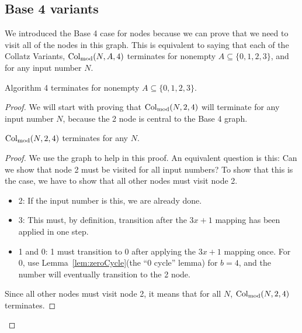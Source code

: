 \subsection{Base 4 variants} \label{subsubsec:base4variants}
We introduced the Base 4 case for nodes because we can prove that we need to visit all of the nodes in this graph. This is equivalent to saying that each of the Collatz Variants, $\mathrm{Col}_{\text{mod}}(N,A,4)$ terminates for nonempty $A \subseteq \{0,1,2,3\}$, and for any input number $N$. 
\begin{theorem}
Algorithm 4 terminates for nonempty $A \subseteq \{0,1,2,3\}$.
\end{theorem}
\begin{proof}
We will start with proving that $\mathrm{Col}_{\text{mod}}(N,2,4)$ will terminate for any input number $N$, because the 2 node is central to the Base 4 graph.\par
\begin{lemma}
\label{lem:collatzSubTwoModFour}
$\mathrm{Col}_{\text{mod}}(N,2,4)$ terminates for any $N$.
\end{lemma} 
\begin{proof}
We use the graph to help in this proof. An equivalent question is this: Can we show that node 2 must be visited for all input numbers? To show that this is the case, we have to show that all other nodes must visit node 2. 
\begin{itemize}
    \item 2: If the input number is this, we are already done.
    \item 3: This must, by definition, transition after the $3x+1$ mapping has been applied in one step.
    \item 1 and 0: 1 must transition to 0 after applying the $3x+1$ mapping once. For 0, use Lemma~\ref{lem:zeroCycle}(the ``0 cycle'' lemma) for $b = 4$, and the number will eventually transition to the 2 node.
\end{itemize}
Since all other nodes must visit node 2, it means that for all $N$, $\mathrm{Col}_{\text{mod}}(N,2,4)$ terminates.
\end{proof} \par


\end{proof}
